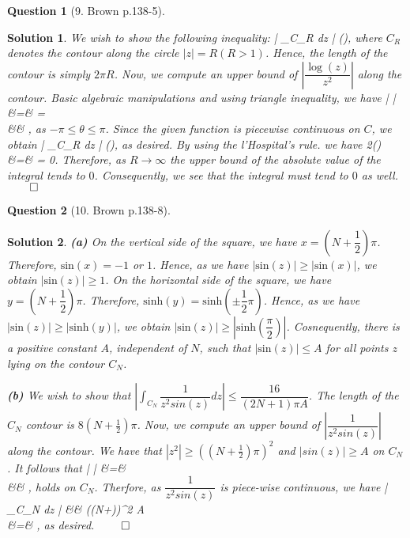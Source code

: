 \documentclass{article} %
\def\eQb#1\eQe{\begin{eqnarray*}#1\end{eqnarray*}}
\theoremstyle{quest}
\newtheorem*{question}{Question}
\newtheorem*{solution}{Solution}
\begin{document}
\begin{question}[9. Brown p.138-5]
\end{question}
\begin{solution}
We wish to show the following inequality:
\eQb
\left| \int_{C_R}  dz \right| \pi(),
\eQe
where $C_R$ denotes the contour along the circle $|z| = R (R>1)$. Hence, the length of the contour
is simply $2\pi R$. Now, we compute an upper bound of $\left| \dfrac{\log(z)}{z^2} \right|$ along
the contour. Basic algebraic manipulations and using triangle inequality, we have
\eQb
\left|  \right| &=&  =  \\
&\leq&  \leq {}, 
\eQe 
as $-\pi \leq \theta \leq \pi$. Since the given function is piecewise continuous on $C$, we obtain 
\eQb
\left| \int_{C_R}  dz \right| \pi(),
\eQe
as desired. By using the l'Hospital's rule. we have
\eQb
\underset{R \to \infty}{\lim} 2\pi() &=& 
  = 0.
\eQe
Therefore, as $R \to \infty$ the upper bound of the absolute value of the integral tends to $0$.
Consequently, we see that the integral must tend to $0$ as well. $\qed$
\end{solution}

\bigskip

\begin{question}[10. Brown p.138-8]
\end{question}
\begin{solution}
\textbf{(a)} 
On the vertical side of the square, we have $ x = (N + \dfrac{1}{2})\pi$. Therefore, 
$\mathrm{sin}(x) = -1$ or $1$. Hence, as we have $|\mathrm{sin}(z)| \geq |\mathrm{sin}(x)|$,
we obtain $|\mathrm{sin}(z)| \geq 1$. On the horizontal side of the square, we have
$y = (N + \dfrac{1}{2})\pi$. Therefore, $\mathrm{sinh}(y) = \mathrm{sinh}(\pm \dfrac{1}{2}\pi)$.
Hence, as we have $|\mathrm{sin}(z)| \geq |\mathrm{sinh}(y)|$, we obtain 
$|\mathrm{sin}(z)| \geq |\mathrm{sinh}(\dfrac{\pi}{2})|$. Cosnequently, there is a positive constant $A$,
independent of $N$, such that $|\mathrm{sin}(z)| \leq A$ for all points $z$ lying on the contour
$C_N$.

\bigskip
 
\textbf{(b)} We wish to show that 
$\left| \int_{C_N} \dfrac{1}{z^2 sin(z)} dz \right| 
\leq \dfrac{16}{(2N+1)\pi A}$.
 The length of the $C_N$ contour is $8(N+\frac{1}{2})\pi$. Now,
we compute an upper bound of $\left| \dfrac{1}{z^2 sin(z)} \right|$ along the contour.
We have that $|z^2| \geq ((N+\frac{1}{2})\pi)^2$ and $|sin(z)| \geq A$ on $C_N$. 
It follows that
\eQb
\left|  \right| &=&  \\
&\leq& ,
\eQe
holds on $C_N$. Therfore, as $\dfrac{1}{z^2 sin(z)}$ is piece-wise continuous, we have
\eQb
\left| \int_{C_N}  dz \right| &\leq& 
{((N+)\pi)^2 A} \\ 
&=& ,
\eQe
as desired. $\qed$

\end{solution}
\end{document}
